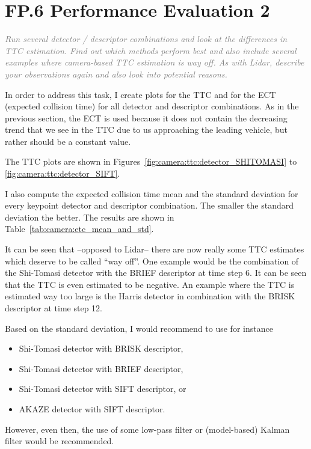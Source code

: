 \documentclass[a4paper]{scrartcl}
\begin{document}
\clearpage

\section*{FP.6 Performance Evaluation 2}
\textcolor{gray}{\textit{Run several detector / descriptor combinations and look at the differences in TTC estimation. Find out which methods perform best and also include several examples where camera-based TTC estimation is way off. As with Lidar, describe your observations again and also look into potential reasons.}}

In order to address this task, I create plots
for the TTC and for the ECT (expected collision time)
for all detector and descriptor combinations.
As in the previous section, the ECT is used because
it does not contain the decreasing trend that we see in the TTC
due to us approaching the leading vehicle,
but rather should be a constant value.

The TTC plots are shown in Figures~\ref{fig:camera:ttc:detector_SHITOMASI}
to \ref{fig:camera:ttc:detector_SIFT}.

I also compute the expected collision time
mean and the standard deviation for
every keypoint detector and descriptor combination.
The smaller the standard deviation the better.
The results are shown in Table~\ref{tab:camera:etc_mean_and_std}.

It can be seen that --opposed to Lidar-- there are now really some TTC estimates
which deserve to be called ``way off''.
One example would be the combination of the Shi-Tomasi detector with
the BRIEF descriptor at time step 6. It can be seen that the TTC is even
estimated to be negative.
An example where the TTC is estimated way too large is the Harris detector
in combination with the BRISK descriptor at time step 12.

Based on the standard deviation, I would recommend to use for instance
\begin{itemize}
	\item Shi-Tomasi detector with BRISK descriptor,
	\item Shi-Tomasi detector with BRIEF descriptor,
	\item Shi-Tomasi detector with SIFT descriptor, or
	\item AKAZE detector with SIFT descriptor.
\end{itemize}
However, even then, the use of some low-pass filter or (model-based)
Kalman filter would be recommended.
\end{document}
